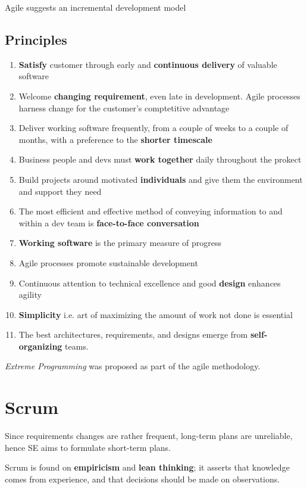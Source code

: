 Agile suggests an incremental development model

\subsection*{Principles}
\begin{enumerate}
    \label{subsec:agile_principles}
    \item \textbf{Satisfy} customer through early and \textbf{continuous delivery} of valuable software
    \item Welcome \textbf{changing requirement}, even late in development.
    Agile processes harness change for the customer's comptetitive advantage
    \item Deliver working software frequently, from a couple of weeks to a couple of months, with a preference to the \textbf{shorter timescale}
    \item Business people and devs must \textbf{work together} daily throughout the prokect
    \item Build projects around motivated \textbf{individuals} and give them the environment and support they need
    \item The most efficient and effective method of conveying information to and within a dev team is \textbf{face-to-face conversation}
    \item \textbf{Working software} is the primary measure of progress
    \item Agile processes promote sustainable development
    \item Continuous attention to technical excellence and good \textbf{design} enhances agility
    \item \textbf{Simplicity} i.e. art of maximizing the amount of work not done is essential
    \item The best architectures, requirements, and designs emerge from \textbf{self-organizing} teams.
\end{enumerate}

\textit{Extreme Programming} was proposed as part of the agile methodology.

\section{Scrum}
Since requirements changes are rather frequent, long-term plans are unreliable,
hence SE aims to formulate short-term plans.

Scrum is found on \textbf{empiricism} and \textbf{lean thinking}; it asserts that knowledge comes from experience, and that decisions should be made on observations.

